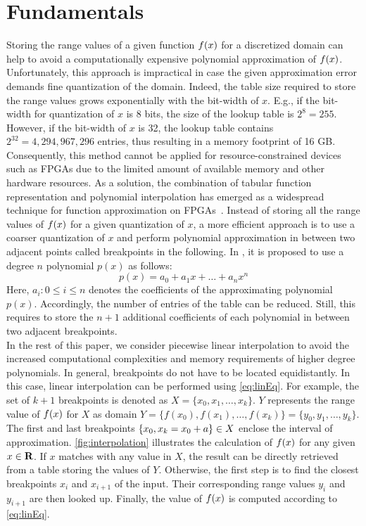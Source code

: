 \section{Fundamentals}
\label{sec:fundamentals}
Storing the range values of a given function $f(x)$ for a discretized domain can help to avoid a computationally expensive 
polynomial approximation of $f(x)$. %
Unfortunately, this approach is impractical in case the given approximation error demands fine quantization of the domain. 
Indeed, the table size required to store the range values grows exponentially with the bit-width of $x$.
E.g., if the bit-width for quantization of $x$ is 8 bits, the size of the lookup table is $2^8 = 255$.
However, if the bit-width of $x$ is 32, the lookup table contains $2^{32}=4,294,967,296$ entries, thus resulting in a memory footprint of 16 GB.
Consequently, this method cannot be applied for 
resource-constrained devices such as \acp{FPGA} due to the limited amount of available memory and other hardware resources. 
As a solution, the combination of tabular function representation and polynomial interpolation has emerged as a widespread technique for function approximation on \acp{FPGA}~\cite{luttab}. 
Instead of storing all the range values of $f(x)$ for a given quantization of $x$, a more efficient approach is to use a coarser quantization of $x$ and perform polynomial approximation in between two adjacent points called breakpoints in the following. 
In \cite{luttab}, it is proposed to use a degree $n$ polynomial $p(x)$ as follows:
\begin{equation}
p(x)=a_0+a_1x+\ldots+a_nx^n
\label{eq:pol}
\end{equation}
Here, $a_i: 0 \leq i \leq n$ denotes the coefficients of the approximating polynomial $p(x)$.
Accordingly, the number of entries of the table can be reduced. 
Still, this requires to store the $n+1$ additional coefficients of each polynomial in between two adjacent breakpoints.\\
In the rest of this paper, we consider piecewise linear interpolation to avoid the increased computational complexities and memory requirements of higher degree polynomials. In general, breakpoints do not have to be located equidistantly. In this case, linear interpolation can be performed using \cref{eq:linEq}. For example, the set of $k+1$ breakpoints is denoted as $X = \{ x_0, x_1, \ldots, x_k\}$. $Y$ represents the range value of $f(x)$ for $X$ as domain $Y= \{f(x_0),f(x_1),\ldots, f(x_k) \} = \{y_0, y_1, \ldots, y_k\}$. The first and last breakpoints $\{x_0, x_k=x_{0}+a\} \in X$ enclose the interval of approximation. \cref{fig:interpolation} illustrates the calculation of $f(x)$ for any given $x \in {\bf R}$. If $x$ matches with any value in $X$, the result can be directly retrieved from a table storing the values of $Y$. Otherwise, the first step is to find the closest breakpoints $x_i$ and $x_{i+1}$ of the input. Their corresponding range values $y_i$ and $y_{i+1}$ are then looked up. Finally, the value of $f(x)$ is computed according to \cref{eq:linEq}.
